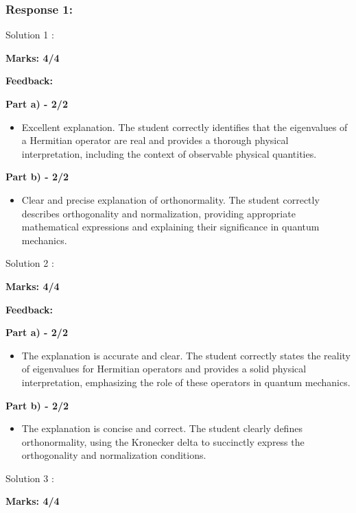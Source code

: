 \documentclass[a4paper,11pt]{article}
\begin{document}
\subsubsection*{Response 1:}

Solution 1 :

\textbf{Marks: 4/4}

\textbf{Feedback:}

\textbf{Part a) - 2/2}

\begin{itemize}
    \item Excellent explanation. The student correctly identifies that the eigenvalues of a Hermitian operator are real and provides a thorough physical interpretation, including the context of observable physical quantities.
\end{itemize}

\textbf{Part b) - 2/2}

\begin{itemize}
    \item Clear and precise explanation of orthonormality. The student correctly describes orthogonality and normalization, providing appropriate mathematical expressions and explaining their significance in quantum mechanics.
\end{itemize}


Solution 2 :

\textbf{Marks: 4/4}

\textbf{Feedback:}

\textbf{Part a) - 2/2}

\begin{itemize}
    \item The explanation is accurate and clear. The student correctly states the reality of eigenvalues for Hermitian operators and provides a solid physical interpretation, emphasizing the role of these operators in quantum mechanics.
\end{itemize}

\textbf{Part b) - 2/2}

\begin{itemize}
    \item The explanation is concise and correct. The student clearly defines orthonormality, using the Kronecker delta to succinctly express the orthogonality and normalization conditions.
\end{itemize}



Solution 3 :

\textbf{Marks: 4/4}
\end{document}

